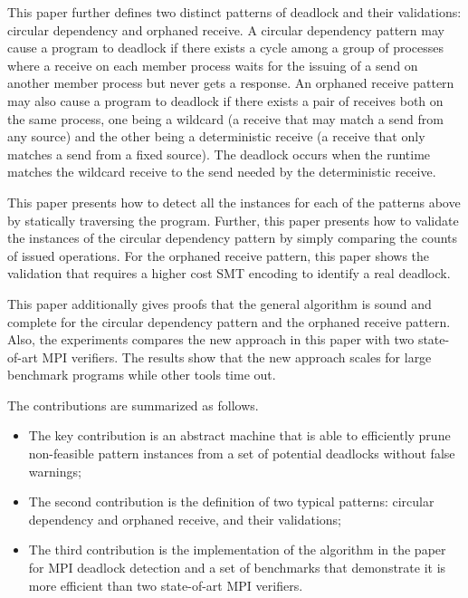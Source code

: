 This paper further defines two distinct patterns of deadlock and their validations: circular dependency and orphaned receive. A circular dependency pattern may cause a program to deadlock if there exists a cycle among a group of processes where a receive on each member process waits for the issuing of a send on another member process but never gets a response. An orphaned receive pattern may also cause a program to deadlock if there exists a pair of receives both on the same process, one being a wildcard (a receive that may match a send from any source) and the other being a deterministic receive (a receive that only matches a send from a fixed source). The deadlock occurs when the runtime matches the wildcard receive to the send needed by the deterministic receive. 

This paper presents how to detect all the instances for each of the patterns above by statically traversing the program. Further, this paper presents how to validate the instances of the circular dependency pattern by simply comparing the counts of issued operations. For the orphaned receive pattern, this paper shows the validation that requires a higher cost SMT encoding to identify a real deadlock. 

This paper additionally gives proofs that the general algorithm is sound and complete for the circular dependency pattern and the orphaned receive pattern. Also, the experiments compares the new approach in this paper with two state-of-art MPI verifiers. The results show that the new approach scales for large benchmark programs while other tools time out.


The contributions are summarized as follows.
\begin{itemize}
\item The key contribution is an abstract machine that is able to efficiently prune non-feasible pattern instances from a set of potential deadlocks without false warnings; 
\item The second contribution is the definition of two typical patterns: circular dependency and orphaned receive, and their validations;
\item The third contribution is the implementation of the algorithm in the paper for MPI deadlock detection and a set of benchmarks that demonstrate it is more efficient than two state-of-art MPI verifiers.
\end{itemize}


